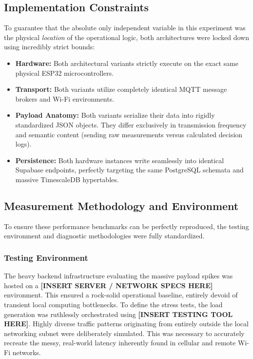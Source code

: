 \subsection{Implementation Constraints}

To guarantee that the absolute only independent variable in this experiment was the physical \textit{location} of the operational logic, both architectures were locked down using incredibly strict bounds:
\begin{itemize}
    \item \textbf{Hardware:} Both architectural variants strictly execute on the exact same physical ESP32 microcontrollers.
    \item \textbf{Transport:} Both variants utilize completely identical MQTT message brokers and Wi-Fi environments.
    \item \textbf{Payload Anatomy:} Both variants serialize their data into rigidly standardized JSON objects. They differ exclusively in transmission frequency and semantic content (sending raw measurements versus calculated decision logs).
    \item \textbf{Persistence:} Both hardware instances write seamlessly into identical Supabase endpoints, perfectly targeting the same PostgreSQL schemata and massive TimescaleDB hypertables.
\end{itemize}

\subsection{Measurement Methodology and Environment}

To ensure these performance benchmarks can be perfectly reproduced, the testing environment and diagnostic methodologies were fully standardized.

\subsubsection{Testing Environment}
The heavy backend infrastructure evaluating the massive payload spikes was hosted on a \textbf{[INSERT SERVER / NETWORK SPECS HERE]} environment. This ensured a rock-solid operational baseline, entirely devoid of transient local computing bottlenecks. To define the stress tests, the load generation was ruthlessly orchestrated using \textbf{[INSERT TESTING TOOL HERE]}. Highly diverse traffic patterns originating from entirely outside the local networking subnet were deliberately simulated. This was necessary to accurately recreate the messy, real-world latency inherently found in cellular and remote Wi-Fi networks.

